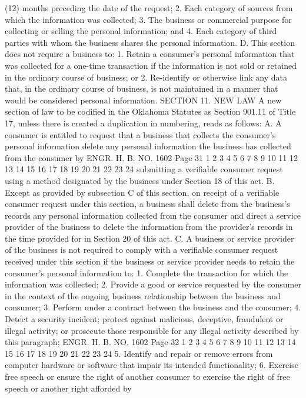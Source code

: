 (12) months preceding the date of the request;
2. Each category of sources from which the information was
collected;
3. The business or commercial purpose for collecting or selling
the personal information; and
4. Each category of third parties with whom the business shares
the personal information.
D. This section does not require a business to:
1. Retain a consumer's personal information that was collected
for a one-time transaction if the information is not sold or
retained in the ordinary course of business; or
2. Re-identify or otherwise link any data that, in the ordinary
course of business, is not maintained in a manner that would be
considered personal information.
SECTION 11. NEW LAW A new section of law to be codified
in the Oklahoma Statutes as Section 901.11 of Title 17, unless there
is created a duplication in numbering, reads as follows:
A. A consumer is entitled to request that a business that
collects the consumer's personal information delete any personal
information the business has collected from the consumer by 
ENGR. H. B. NO. 1602 Page 31
1
2
3
4
5
6
7
8
9
10
11
12
13
14
15
16
17
18
19
20
21
22
23
24
submitting a verifiable consumer request using a method designated
by the business under Section 18 of this act.
B. Except as provided by subsection C of this section, on
receipt of a verifiable consumer request under this section, a
business shall delete from the business's records any personal
information collected from the consumer and direct a service
provider of the business to delete the information from the
provider's records in the time provided for in Section 20 of this
act.
C. A business or service provider of the business is not
required to comply with a verifiable consumer request received under
this section if the business or service provider needs to retain the
consumer's personal information to:
1. Complete the transaction for which the information was
collected;
2. Provide a good or service requested by the consumer in the
context of the ongoing business relationship between the business
and consumer;
3. Perform under a contract between the business and the
consumer;
4. Detect a security incident; protect against malicious,
deceptive, fraudulent or illegal activity; or prosecute those
responsible for any illegal activity described by this paragraph;
ENGR. H. B. NO. 1602 Page 32
1
2
3
4
5
6
7
8
9
10
11
12
13
14
15
16
17
18
19
20
21
22
23
24
5. Identify and repair or remove errors from computer hardware
or software that impair its intended functionality;
6. Exercise free speech or ensure the right of another consumer
to exercise the right of free speech or another right afforded by
